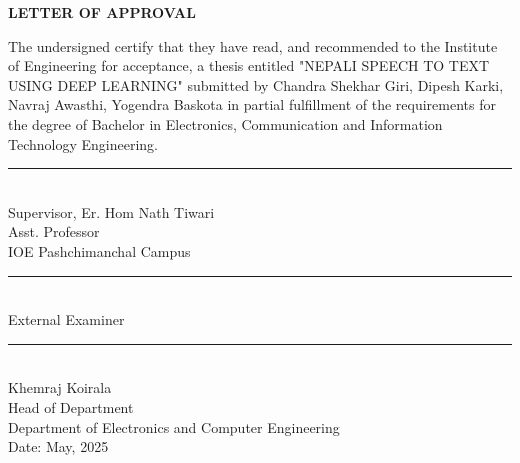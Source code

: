 \cleardoublepage
{}
\begin{centering}
\textbf{LETTER OF APPROVAL}\\

\end{centering}
\vspace{12pt}
The undersigned certify that they have read, and recommended to the Institute of Engineering for acceptance, a  thesis entitled "NEPALI SPEECH TO TEXT USING DEEP LEARNING" submitted by Chandra Shekhar Giri, Dipesh Karki, Navraj Awasthi, Yogendra Baskota  in partial fulfillment of the requirements for the degree of Bachelor in Electronics, Communication and Information Technology Engineering.
\begin{flushleft}
    \vfill
    \rule{0.5\linewidth}{0.4pt}
    \\
    Supervisor, Er. Hom Nath Tiwari
    \\
    Asst. Professor
    \\
    IOE Pashchimanchal Campus
    
    \vfill
    \rule{0.5\linewidth}{0.4pt}
    \\
    External Examiner  \\
    
    
    \vfill
    \rule{0.5\linewidth}{0.4pt}
    \\
    Khemraj Koirala\\
    Head of Department\\
    Department of Electronics and Computer Engineering\\
    
    \vfill
    \hspace{0pt} 
    Date: May, 2025
    \vfill
\end{flushleft}
